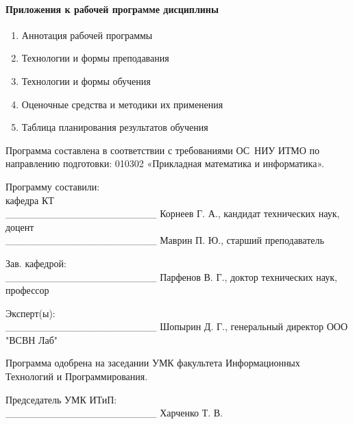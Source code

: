 \paragraph{Приложения к рабочей программе дисциплины}
{
\begin{enumerate}
\item Аннотация рабочей программы
\item Технологии и формы преподавания 
\item Технологии и формы обучения 
\item Оценочные средства и методики их применения
\item Таблица планирования результатов обучения
\end{enumerate}
}

\vspace{1cm}

Программа составлена в соответствии с требованиями ОС НИУ ИТМО по направлению подготовки: 010302 «Прикладная математика и информатика».

\vspace{1cm}

{\parindent0pt
Программу составили:\\
кафедра КТ\\ \_\_\_\_\_\_\_\_\_\_\_\_\_\_\_\_\_\_\_\_\_ Корнеев Г. А., кандидат технических наук, доцент\\ \_\_\_\_\_\_\_\_\_\_\_\_\_\_\_\_\_\_\_\_\_ Маврин П. Ю., старший преподаватель

\vspace{1cm}

Зав. кафедрой:\\
\_\_\_\_\_\_\_\_\_\_\_\_\_\_\_\_\_\_\_\_\_ Парфенов В. Г., доктор технических наук, профессор

\vspace{1cm}

Эксперт(ы):\\ \_\_\_\_\_\_\_\_\_\_\_\_\_\_\_\_\_\_\_\_\_ Шопырин Д. Г., генеральный директор ООО "ВСВН Лаб"

\vfill

Программа одобрена на заседании УМК факультета Информационных Технологий и Программирования.

\vspace{1cm}

Председатель УМК ИТиП:\\
\_\_\_\_\_\_\_\_\_\_\_\_\_\_\_\_\_\_\_\_\_ Харченко Т. В.
}

